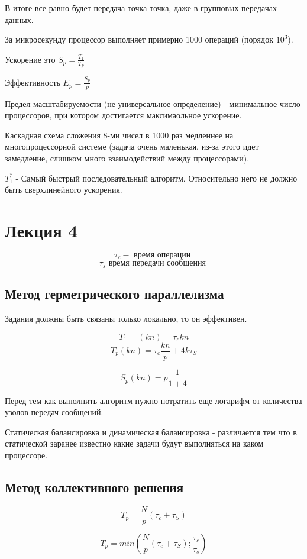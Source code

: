 \documentclass[14pt]{extarticle}
\begin{document}
В итоге все равно будет передача точка-точка, даже в групповых передачах данных.

За микросекунду процессор выполняет примерно 1000 операций (порядок $ 10^3 $).

Ускорение это $ S_p = \frac{T_1}{T_p}  $

Эффективность $ E_p = \frac{S_p }{p} $

Предел масштабируемости (не универсальное определение) - минимальное число процессоров, при котором достигается максимаольное ускорение.

Каскадная схема сложения 8-ми чисел в 1000 раз медленнее на многопроцессорной системе (задача очень маленькая, из-за этого идет замедление, слишком много взаимодействий между процессорами).

$ T_1^* $ - Самый быстрый последовательный алгоритм. Относительно него не должно быть сверхлинейного ускорения.

\section{Лекция 4}

\[ \tau_c - \textrm{ время операции } \]
\[ \tau_s \textrm{ время передачи сообщения } \]

\subsection{Метод герметрического параллелизма}

Задания должны быть связаны только локально, то он эффективен.

\[ T_1 =(kn) = \tau_c kn \]
\[ T_p(kn) = \tau_c \frac{kn}{p} + 4k \tau_S \]

\[ S_p (kn) = p \frac{1}{1+4}  \]

Перед тем как выполнить алгоритм нужно потратить еще логарифм от количества узолов передач сообщений.

Статическая балансировка и динамическая балансировка - различается тем что в статической заранее известно какие задачи будут выполняться на каком процессоре.

\subsection{Метод коллективного решения}

\[ T_p = \frac{N }{p}(\tau_c + \tau_S) \]

\[ T_p = min(\frac{N }{p}(\tau_c + \tau_S); \frac{\tau_c}{\tau_s}) \]
\end{document}
